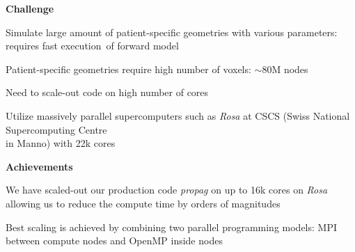\documentclass[20pt]{ICSPoster}
\begin{document}
\begin{posterbox}[2]
    \begin{headerbox}[
        title=A Case for High Performance Computing,
        height=0.28\textheight,
        width=0.47\textwidth]
      \textbf{Challenge}
      \begin{compactitem}
        \item Simulate large amount of patient-specific geometries with various
              parameters: requires fast execution\ of forward model
        \item Patient-specific geometries require high number of voxels: $\sim 80$M nodes
        \item Need to scale-out code on high number of cores
        \item Utilize massively parallel supercomputers such as \textit{Rosa} at CSCS
              (Swiss National Supercomputing Centre\\ in Manno) with 22k cores
      \end{compactitem}

      \vspace{0.5cm}

      \textbf{Achievements}
      \begin{compactitem}
        \item We have scaled-out our production code \textit{propag} on up to 16k cores on \textit{Rosa}
              allowing us to reduce the compute time by orders of magnitudes
        \item Best scaling is achieved by combining two parallel programming models:
              MPI between compute nodes and OpenMP inside nodes
      \end{compactitem}

      \vspace{0.5cm}


\end{headerbox}
\end{posterbox}
\end{document}
